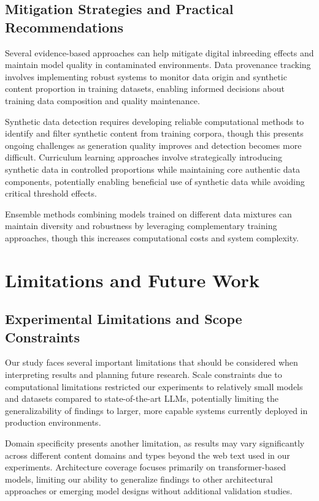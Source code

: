 \documentclass{article}
\begin{document}
\subsection{Mitigation Strategies and Practical Recommendations}

Several evidence-based approaches can help mitigate digital inbreeding effects and maintain model quality in contaminated environments. Data provenance tracking involves implementing robust systems to monitor data origin and synthetic content proportion in training datasets, enabling informed decisions about training data composition and quality maintenance.

Synthetic data detection requires developing reliable computational methods to identify and filter synthetic content from training corpora, though this presents ongoing challenges as generation quality improves and detection becomes more difficult. Curriculum learning approaches involve strategically introducing synthetic data in controlled proportions while maintaining core authentic data components, potentially enabling beneficial use of synthetic data while avoiding critical threshold effects.

Ensemble methods combining models trained on different data mixtures can maintain diversity and robustness by leveraging complementary training approaches, though this increases computational costs and system complexity.

\section{Limitations and Future Work}

\subsection{Experimental Limitations and Scope Constraints}

Our study faces several important limitations that should be considered when interpreting results and planning future research. Scale constraints due to computational limitations restricted our experiments to relatively small models and datasets compared to state-of-the-art LLMs, potentially limiting the generalizability of findings to larger, more capable systems currently deployed in production environments.

Domain specificity presents another limitation, as results may vary significantly across different content domains and types beyond the web text used in our experiments. Architecture coverage focuses primarily on transformer-based models, limiting our ability to generalize findings to other architectural approaches or emerging model designs without additional validation studies.
\end{document}
